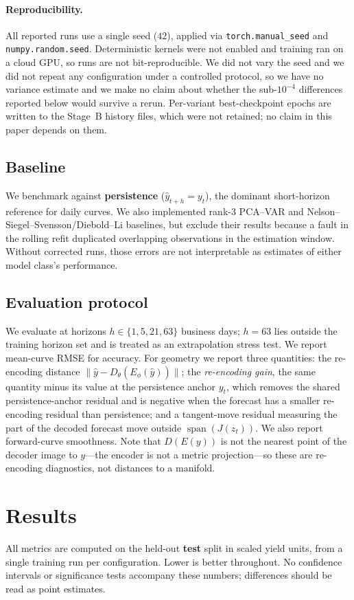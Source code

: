 \documentclass{article} %
\begin{document}
\paragraph{Reproducibility.} All reported runs use a single seed ($42$), applied via
\texttt{torch.manual\allowbreak\_seed} and
\texttt{numpy.random\allowbreak.seed}. Deterministic kernels
were not enabled and training ran on a cloud GPU, so runs are not bit-reproducible.
We did not vary the seed and we did not repeat any configuration under a controlled
protocol, so we have no variance estimate and we make no claim about whether the
sub-$10^{-4}$ differences reported below would survive a rerun. Per-variant
best-checkpoint epochs are written to the Stage~B history files, which were not
retained; no claim in this paper depends on them.
\subsection{Baseline}
We benchmark against \textbf{persistence} ($\hat{y}_{t+h}=y_t$), the dominant
short-horizon reference for daily curves. We also implemented rank-3 PCA--VAR and
Nelson--Siegel--Svensson/Diebold--Li baselines, but exclude their results because a
fault in the rolling refit duplicated overlapping observations in the estimation
window. Without corrected runs, those errors are not interpretable as estimates of
either model class's performance.
\subsection{Evaluation protocol}
We evaluate at horizons $h\in\{1,5,21,63\}$ business days; $h{=}63$ lies outside
the training horizon set and is treated as an extrapolation stress test. We report
mean-curve RMSE for accuracy. For geometry we report three quantities: the
re-encoding distance $\|\hat{y}-D_\theta(E_\phi(\hat{y}))\|$; the \emph{re-encoding
gain}, the same quantity minus its value at the persistence anchor $y_t$, which
removes the shared persistence-anchor residual and is negative when the forecast has
a smaller re-encoding residual than persistence; and a tangent-move residual
measuring the part of the decoded forecast move outside
$\operatorname{span}(J(z_t))$. We also report forward-curve smoothness. Note that
$D(E(y))$ is not the nearest point of the decoder image to $y$---the encoder is not
a metric projection---so these are re-encoding diagnostics, not distances to a
manifold.
\section{Results}
\label{sec:results}
All metrics are computed on the held-out \textbf{test} split in scaled yield units,
from a single training run per configuration. Lower is better throughout. No
confidence intervals or significance tests accompany these numbers; differences
should be read as point estimates.
\end{document}
